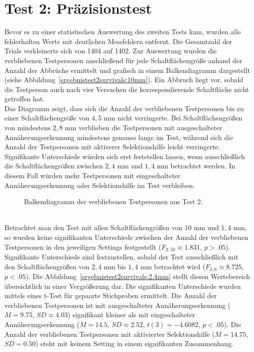 \documentclass[12pt,numbers=noenddot,parskip,bibliography=totocnumbered,listof=totocnumbered]{scrreprt}
\begin{document}
\section{Test 2: Präzisionstest}
Bevor es zu einer statistischen Auswertung des zweiten Tests kam, wurden alle fehlerhaften Werte mit deutlichen Messfehlern entfernt. Die Gesamtzahl der Trials verkleinerte sich von 1404 auf 1402. Zur Auswertung wurden die verbliebenen Testpersonen anschließend für jede Schaltflächengröße anhand der Anzahl der Abbrüche ermittelt und grafisch in einem Balkendiagramm dargestellt (siehe Abbildung~\ref{ergebnistest2survivals:10mm}). Ein Abbruch liegt vor, sobald die Testperson auch nach vier Versuchen die korrespondierende Schaltfläche nicht getroffen hat.\\
Das Diagramm zeigt, dass sich die Anzahl der verbliebenen Testpersonen bis zu einer Schaltflächengröße von $4{,}5$ mm nicht verringerte. Bei Schaltflächengrößen von mindestens $2{,}8$ mm verblieben die Testpersonen mit ausgeschalteter Annäherungserkennung mindestens genauso lange im Test, während sich die Anzahl der Testpersonen mit aktiverer Selektionshilfe leicht verringerte. Signifikante Unterschiede würden sich erst feststellen lassen, wenn ausschließlich die Schaltflächengrößen zwischen $2{,}4$ mm und $1{,}4$ mm betrachtet werden. In diesem Fall würden mehr Testpersonen mit eingeschalteter Annäherungserkennung oder Selektionshilfe im Test verbleiben.
\begin{figure}
\centering
{}%
\vfill
{}%
\caption{Balkendiagramm der verbliebenen Testpersonen aus Test 2.}
\label{ergebnistest2survivals}
\end{figure}\\
Betrachtet man den Test mit allen Schaltflächengrößen von $10$ mm und $1{,}4$ mm, so wurden keine signifikanten Unterschiede zwischen der Anzahl der verbliebenen Testpersonen in den jeweiligen Settings festgestellt ($F_{2,50}\approx 1.831$, $p > .05$). Signifikante Unterschiede sind festzustellen, sobald der Test ausschließlich mit den Schaltflächengrößen von $2{,}4$ mm bis $1{,}4$ mm betrachtet wird ($F_{2,6}\approx 8.725$, $p < .05$). Die Abbildung~\ref{ergebnistest2survivals:2.4mm} stellt diesen Wertebereich übersichtlich in einer Vergrößerung dar. Die signifikanten Unterschiede wurden mittels eines t-Test für gepaarte Stichproben ermittelt. Die Anzahl der verbliebenen Testpersonen ist mit ausgeschalteter Annäherungserkennung ($M = 9.75$, $SD\approx 4.03$) signifikant kleiner als mit eingeschalteter Annäherungserkennung ($M = 14.5$, $SD\approx 2.52$, $t(3) = -4.6082$, $p < .05$). Die Anzahl der verbliebenen Testpersonen mit aktivierter Selektionshilfe ($M = 14.75$, $SD = 0.50$) steht mit keinem Setting in einem signifikanten Zusammenhang.
\end{document}
